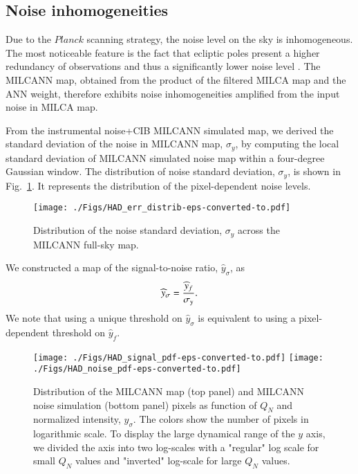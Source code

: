 \documentclass[traditabstract,a4,twocolumn]{aa}
\begin{document}
\subsection{Noise inhomogeneities}
Due to the $Planck$ scanning strategy, the noise level on the sky is
inhomogeneous. The most noticeable feature is the fact that ecliptic poles present a higher redundancy of observations and thus a significantly lower noise level
\citep{PlanckMIS}. The MILCANN map, obtained from the product of the filtered MILCA map and the ANN weight, therefore exhibits noise
inhomogeneities amplified from the input noise in MILCA map.

From the instrumental noise+CIB MILCANN simulated map, we derived the standard deviation of the noise in MILCANN map, $\sigma_y$, by computing the local standard deviation of
MILCANN simulated noise map within a four-degree Gaussian window. The  distribution of noise standard deviation, $\sigma_y$, is shown in Fig.~\ref{nhom}. It represents the distribution of the pixel-dependent noise levels.

\label{secnh}
\begin{figure}[!th]
\begin{center}
\texttt{[image: ./Figs/HAD\_err\_distrib-eps-converted-to.pdf]}
\caption{Distribution of the noise standard deviation, $\sigma_y$ across the MILCANN full-sky map.}
\label{nhom}
\end{center}
\end{figure}

We constructed a map of the signal-to-noise ratio, $\widehat{y}_\sigma$, as
\begin{align}
\widehat{y}_{\sigma} = \frac{\widehat{y}_{f}}{\sigma_{\rm y}}.
\end{align}
We note that using a unique threshold on $\widehat{y}_{\sigma}$
is equivalent to using a pixel-dependent threshold on
$\widehat{y}_{f}$.

\begin{figure}[!th]
\begin{center}
\texttt{[image: ./Figs/HAD\_signal\_pdf-eps-converted-to.pdf]}
\texttt{[image: ./Figs/HAD\_noise\_pdf-eps-converted-to.pdf]}
\caption{Distribution of the MILCANN map (top panel) and MILCANN noise simulation (bottom panel) pixels as function of $Q_N$ and normalized intensity, $y_\sigma$. The colors show the number of pixels in logarithmic scale. To display the large dynamical range of the $y$ axis, we divided the axis into two log-scales with a "regular" log scale for small $Q_N$ values and "inverted" log-scale for large $Q_N$ values.}

\label{qnY}
\end{center}
\end{figure}
\end{document}
